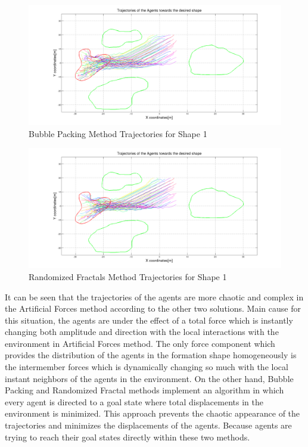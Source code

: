 \begin{figure}[H]
\caption{Bubble Packing Method Trajectories for Shape 1}
\centerline{\includegraphics[scale = 0.32]{Bubble_Trajectories_1}}
\end{figure} 	
		
\begin{figure}[H]
\caption{Randomized Fractals Method Trajectories for Shape 1}
\centerline{\includegraphics[scale = 0.32]{Randomized_Trajectories_1}}
\end{figure} 	
			
It can be seen that the trajectories of the agents are more chaotic and complex in the Artificial Forces method according to the other two solutions. Main cause for this situation, the agents are under the effect of a total force which is instantly changing both amplitude and direction with the local interactions with the environment in Artificial Forces method. The only force component which provides the distribution of the agents in the formation shape homogeneously is the intermember forces which is dynamically changing so much with the local instant neighbors of the agents in the environment. On the other hand, Bubble Packing and Randomized Fractal methods implement an algorithm in which every agent is directed to a goal state where total displacements in the environment is minimized. This approach prevents the chaotic appearance of the trajectories and minimizes the displacements of the agents. Because agents are trying to reach their goal states directly within these two methods. 

